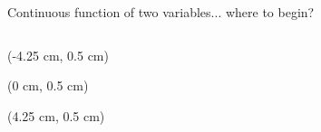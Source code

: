\documentclass[svgnames]{beamer}
\begin{document}
\begin{frame}[t]{Continuous function of two variables... where to begin?}
\begin{columns}
\begin{column}{0.33\textwidth}
  \end{column}
  \begin{column}{0.33\textwidth}
  \end{column}
 \end{columns}
 
 \begin{textblock*}{\linewidth}(-4.25 cm, 0.5 cm)
 \end{textblock*}
 
 \begin{textblock*}{\linewidth}(0 cm, 0.5 cm)
 \end{textblock*}
 
  \begin{textblock*}{\linewidth}(4.25 cm, 0.5 cm)
 \end{textblock*}


\end{frame}
\end{document}
